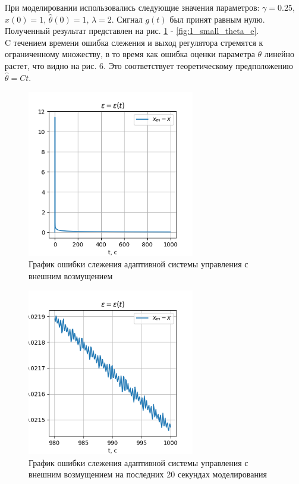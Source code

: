 \documentclass{article}
\begin{document}
При моделировании использовались следующие значения параметров: $\gamma = 0.25$, $x(0) = 1$, $\hat \theta(0) = 1$, $\lambda = 2$. Сигнал $g(t)$ был принят равным нулю. Полученный результат представлен на рис. \ref{fig:1_epsilon} - \ref{fig:1_small_theta_e}. \\
C течением времени ошибка слежения и выход регулятора стремятся к ограниченному множеству, в то время как ошибка оценки параметра $\theta$ линейно растет, что видно на рис. 6. Это соответствует теоретическому предположению $\hat \theta = Ct$.

\begin{figure}[h!]
  \centering
  \includegraphics[width=0.65\textwidth]{figs/1_epsilon.png}
  \caption{График ошибки слежения адаптивной системы управления с внешним возмущением} 
  \label{fig:1_epsilon}
\end{figure}

\begin{figure}[h!]
  \centering
  \includegraphics[width=0.65\textwidth]{figs/1_epsilon_small.png}
  \caption{График ошибки слежения адаптивной системы управления с внешним возмущением на последних 20 секундах моделирования} 
  \label{fig:1_epsilon_small}
\end{figure}
\end{document}
